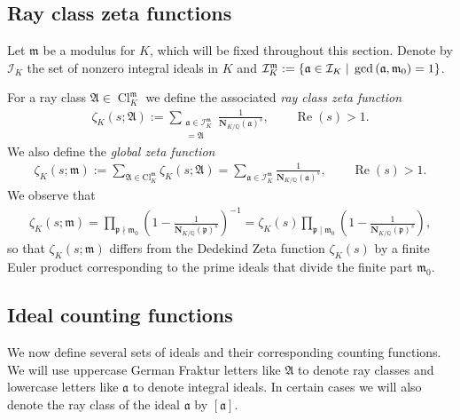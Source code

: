 \documentclass[11pt, reqno]{amsart}
\numberwithin{equation}{section}
\newcommand{\suchthat}{\;\ifnum\currentgrouptype=16 \middle\fi|\;}
\newcommand{\Q}{\mathbb{Q}}
\newcommand{\Cl}{\operatorname{Cl}}
\newcommand{\Nrm}[2]{\mathbf{N}_{#1}(#2)}
\theoremstyle{definition}
\begin{document}
\subsection{Ray class zeta functions}

Let $\mathfrak{m}$ be a modulus for $K$, which will be fixed throughout this section.
Denote by $\mathcal{I}_K$ the set of nonzero integral ideals in $K$ and $\mathcal{I}_K^{\mathfrak{m}} := \{ \mathfrak{a} \in \mathcal{I}_K \suchthat \gcd{(\mathfrak{a}, \mathfrak{m}_0)} = 1 \}$.

For a ray class $\mathfrak{A} \in \Cl_K^{\mathfrak{m}}$ we define the associated \textit{ray class zeta function}
\begin{align}\label{eqn:ray-class-zeta-function}
\zeta_K(s;\mathfrak{A})
:=
\sum_{\substack{
\mathfrak{a}\in \mathcal{I}_K^{\mathfrak{m}}\\
[\mathfrak{a}]=\mathfrak{A}
}}
\frac{1}{\mathbf{N}_{K/\mathbb{Q}}(\mathfrak{a})^s}, \qquad \operatorname{Re}(s) > 1.
\end{align}
We also define the \textit{global zeta function}
\begin{align}
\label{eqn:global-zeta-function}
\zeta_K(s; \mathfrak{m}) := \sum_{\mathfrak{A}\in \mathrm{Cl}_K^{\mathfrak{m}}}
\zeta_K(s; \mathfrak{A}) = \sum_{\mathfrak{a} \in \mathcal{I}_K^{\mathfrak{m}}} \frac{1}{\Nrm{K/\Q}{\mathfrak{a}}^s}, \qquad \operatorname{Re}(s) > 1.
\end{align}
We observe that
\begin{align}\label{eqn:dedekind-zeta-and-zeta-modulo}
\zeta_K(s; \mathfrak{m}) = \prod_{\mathfrak{p} \nmid \mathfrak{m}_0} \left( 1 - \frac{1}{\Nrm{K/\Q}{\mathfrak{p}}^s} \right)^{-1} = \zeta_{K}(s) \prod_{\mathfrak{p} \mid \mathfrak{m}_0} \left( 1 - \frac{1}{\Nrm{K/\Q}{\mathfrak{p}}^s} \right),
\end{align}
so that $\zeta_K(s; \mathfrak{m})$ differs from the Dedekind Zeta function $\zeta_K(s)$ by a finite Euler product corresponding to the prime ideals that divide the finite part $\mathfrak{m}_0$.

\subsection{Ideal counting functions}

We now define several sets of ideals and their corresponding counting functions. We will use uppercase German Fraktur letters like $\mathfrak{A}$ to denote ray classes and lowercase letters like $\mathfrak{a}$ to denote integral ideals. In certain cases we will also denote the ray class of the ideal $\mathfrak{a}$ by $[\mathfrak{a}]$.
\end{document}
